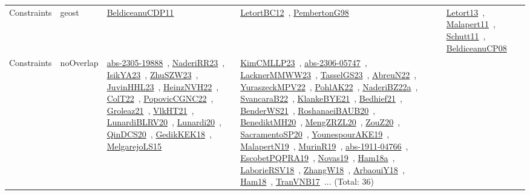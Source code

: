 {\begin{longtable}{lp{3cm}>{\raggedright\arraybackslash}p{6cm}>{\raggedright\arraybackslash}p{6cm}>{\raggedright\arraybackslash}p{8cm}}
Constraints & geost & \href{works/BeldiceanuCDP11.pdf}{BeldiceanuCDP11}~\cite{BeldiceanuCDP11} & \href{works/LetortBC12.pdf}{LetortBC12}~\cite{LetortBC12}, \href{works/PembertonG98.pdf}{PembertonG98}~\cite{PembertonG98} & \href{works/Letort13.pdf}{Letort13}~\cite{Letort13}, \href{works/Malapert11.pdf}{Malapert11}~\cite{Malapert11}, \href{works/Schutt11.pdf}{Schutt11}~\cite{Schutt11}, \href{works/BeldiceanuCP08.pdf}{BeldiceanuCP08}~\cite{BeldiceanuCP08}\\
Constraints & noOverlap & \href{works/abs-2305-19888.pdf}{abs-2305-19888}~\cite{abs-2305-19888}, \href{works/NaderiRR23.pdf}{NaderiRR23}~\cite{NaderiRR23}, \href{works/IsikYA23.pdf}{IsikYA23}~\cite{IsikYA23}, \href{works/ZhuSZW23.pdf}{ZhuSZW23}~\cite{ZhuSZW23}, \href{works/JuvinHHL23.pdf}{JuvinHHL23}~\cite{JuvinHHL23}, \href{works/HeinzNVH22.pdf}{HeinzNVH22}~\cite{HeinzNVH22}, \href{works/ColT22.pdf}{ColT22}~\cite{ColT22}, \href{works/PopovicCGNC22.pdf}{PopovicCGNC22}~\cite{PopovicCGNC22}, \href{works/Groleaz21.pdf}{Groleaz21}~\cite{Groleaz21}, \href{works/VlkHT21.pdf}{VlkHT21}~\cite{VlkHT21}, \href{works/LunardiBLRV20.pdf}{LunardiBLRV20}~\cite{LunardiBLRV20}, \href{works/Lunardi20.pdf}{Lunardi20}~\cite{Lunardi20}, \href{works/QinDCS20.pdf}{QinDCS20}~\cite{QinDCS20}, \href{works/GedikKEK18.pdf}{GedikKEK18}~\cite{GedikKEK18}, \href{works/MelgarejoLS15.pdf}{MelgarejoLS15}~\cite{MelgarejoLS15} & \href{works/KimCMLLP23.pdf}{KimCMLLP23}~\cite{KimCMLLP23}, \href{works/abs-2306-05747.pdf}{abs-2306-05747}~\cite{abs-2306-05747}, \href{works/LacknerMMWW23.pdf}{LacknerMMWW23}~\cite{LacknerMMWW23}, \href{works/TasselGS23.pdf}{TasselGS23}~\cite{TasselGS23}, \href{works/AbreuN22.pdf}{AbreuN22}~\cite{AbreuN22}, \href{works/YuraszeckMPV22.pdf}{YuraszeckMPV22}~\cite{YuraszeckMPV22}, \href{works/PohlAK22.pdf}{PohlAK22}~\cite{PohlAK22}, \href{works/NaderiBZ22a.pdf}{NaderiBZ22a}~\cite{NaderiBZ22a}, \href{works/SvancaraB22.pdf}{SvancaraB22}~\cite{SvancaraB22}, \href{works/KlankeBYE21.pdf}{KlankeBYE21}~\cite{KlankeBYE21}, \href{works/Bedhief21.pdf}{Bedhief21}~\cite{Bedhief21}, \href{works/BenderWS21.pdf}{BenderWS21}~\cite{BenderWS21}, \href{works/RoshanaeiBAUB20.pdf}{RoshanaeiBAUB20}~\cite{RoshanaeiBAUB20}, \href{works/BenediktMH20.pdf}{BenediktMH20}~\cite{BenediktMH20}, \href{works/MengZRZL20.pdf}{MengZRZL20}~\cite{MengZRZL20}, \href{works/ZouZ20.pdf}{ZouZ20}~\cite{ZouZ20}, \href{works/SacramentoSP20.pdf}{SacramentoSP20}~\cite{SacramentoSP20}, \href{works/YounespourAKE19.pdf}{YounespourAKE19}~\cite{YounespourAKE19}, \href{works/MalapertN19.pdf}{MalapertN19}~\cite{MalapertN19}, \href{works/MurinR19.pdf}{MurinR19}~\cite{MurinR19}, \href{works/abs-1911-04766.pdf}{abs-1911-04766}~\cite{abs-1911-04766}, \href{works/EscobetPQPRA19.pdf}{EscobetPQPRA19}~\cite{EscobetPQPRA19}, \href{works/Novas19.pdf}{Novas19}~\cite{Novas19}, \href{works/Ham18a.pdf}{Ham18a}~\cite{Ham18a}, \href{works/LaborieRSV18.pdf}{LaborieRSV18}~\cite{LaborieRSV18}, \href{works/ZhangW18.pdf}{ZhangW18}~\cite{ZhangW18}, \href{works/ArbaouiY18.pdf}{ArbaouiY18}~\cite{ArbaouiY18}, \href{works/Ham18.pdf}{Ham18}~\cite{Ham18}, \href{works/TranVNB17.pdf}{TranVNB17}~\cite{TranVNB17}... (Total: 36) 
\end{longtable}}
